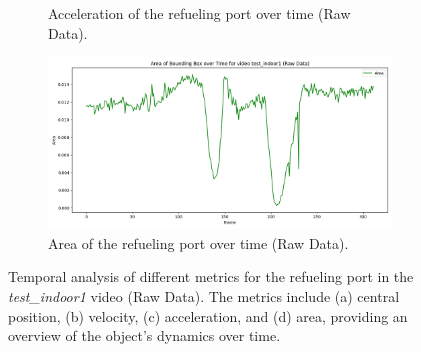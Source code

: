 \documentclass[12pt,oneside]{book} %
\begin{document}
\begin{figure}[H]
\begin{subfigure}[t]{0.45\textwidth}
        \caption{Acceleration of the refueling port over time (Raw Data).}
        \label{fig:acceleration-test-indoor1}
    \end{subfigure}
    \hfill
    \begin{subfigure}[t]{0.45\textwidth}
        \includegraphics[width=\textwidth]{figures/bbox_metrics/test_indoor1 (Raw Data)_area.png}
        \caption{Area of the refueling port over time (Raw Data).}
        \label{fig:size-test-indoor1}
    \end{subfigure}
    \caption{Temporal analysis of different metrics for the refueling port in the \textit{test\_indoor1} video (Raw Data). The metrics include (a) central position, (b) velocity, (c) acceleration, and (d) area, providing an overview of the object's dynamics over time.}
    \label{fig:bbox-metrics-test-indoor1}
\end{figure}
\end{document}

